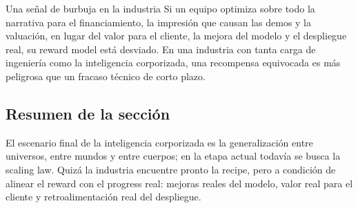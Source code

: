 \begin{warningbox}{Una señal de burbuja en la industria}
Si un equipo optimiza sobre todo la narrativa para el financiamiento, la impresión que causan las demos y la valuación, en lugar del valor para el cliente, la mejora del modelo y el despliegue real, su reward model está desviado. En una industria con tanta carga de ingeniería como la inteligencia corporizada, una recompensa equivocada es más peligrosa que un fracaso técnico de corto plazo.
\end{warningbox}

\subsection{Resumen de la sección}

El escenario final de la inteligencia corporizada es la generalización entre universos, entre mundos y entre cuerpos; en la etapa actual todavía se busca la scaling law. Quizá la industria encuentre pronto la recipe, pero a condición de alinear el reward con el progress real: mejoras reales del modelo, valor real para el cliente y retroalimentación real del despliegue.
